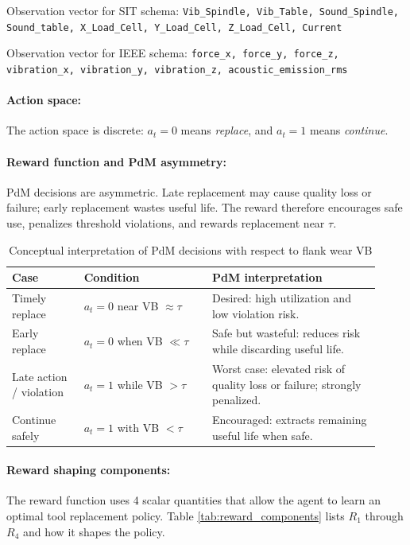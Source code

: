 \documentclass[sn-basic]{sn-jnl}%
\begin{document}
Observation vector for SIT schema: \texttt{Vib\_Spindle, Vib\_Table, Sound\_Spindle, Sound\_table, X\_Load\_Cell, Y\_Load\_Cell, Z\_Load\_Cell, Current}


Observation vector for IEEE schema: \texttt{force\_x, force\_y, force\_z, vibration\_x, vibration\_y, vibration\_z, acoustic\_emission\_rms}

\paragraph{Action space:}
The action space is discrete: $a_t=0$ means \emph{replace}, and $a_t=1$ means \emph{continue}.

\paragraph{Reward function and PdM asymmetry:}
PdM decisions are asymmetric. Late replacement may cause quality loss or failure; early replacement wastes useful life. The reward therefore encourages safe use, penalizes threshold violations, and rewards replacement near $\tau$.

\begin{table}[htbp]
	\centering
	\caption{Conceptual interpretation of PdM decisions with respect to flank wear \textsc{VB}}
	\label{tab:cost_view}
	\begin{tabular}{L{0.18\linewidth} L{0.32\linewidth} L{0.42\linewidth}}
		\toprule
		\textbf{Case} & \textbf{Condition} & \textbf{PdM interpretation}\\
		\midrule
		Timely replace & $a_t=0$ near \textsc{VB} $\approx\tau$ & Desired: high utilization and low violation risk.\\
		Early replace & $a_t=0$ when \textsc{VB} $\ll\tau$ & Safe but wasteful: reduces risk while discarding useful life.\\
		Late action / violation & $a_t=1$ while \textsc{VB} $>\tau$ & Worst case: elevated risk of quality loss or failure; strongly penalized.\\
		Continue safely & $a_t=1$ with \textsc{VB} $<\tau$ & Encouraged: extracts remaining useful life when safe.\\
		\bottomrule
	\end{tabular}
\end{table}

\paragraph{Reward shaping components:} The reward function uses 4 scalar quantities that allow the agent to learn an optimal tool replacement policy. Table \ref{tab:reward_components} lists $R_1$ through $R_4$ and how it shapes the policy.
\end{document}
